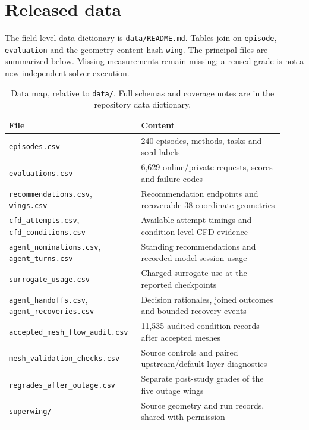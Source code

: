 \section{Released data}
\label{app:datacard}

The field-level data dictionary is \texttt{data/README.md}. Tables join on
\texttt{episode}, \texttt{evaluation} and the geometry content hash
\texttt{wing}. The principal files are summarized below. Missing measurements
remain missing; a reused grade is not a new independent solver execution.

\begin{table}[htbp]
\centering\small
\caption{Data map, relative to \texttt{data/}. Full schemas and coverage notes
are in the repository data dictionary.}
\label{tab:data-overview}
\begin{tabular}{p{0.42\linewidth}p{0.50\linewidth}}
\toprule
File & Content \\
\midrule
\texttt{episodes.csv} & 240 episodes, methods, tasks and seed labels \\
\texttt{evaluations.csv} & 6{,}629 online/private requests, scores and failure codes \\
\texttt{recommendations.csv}, \texttt{wings.csv} & Recommendation endpoints and recoverable 38-coordinate geometries \\
\texttt{cfd\_attempts.csv}, \texttt{cfd\_conditions.csv} & Available attempt timings and condition-level CFD evidence \\
\texttt{agent\_nominations.csv}, \texttt{agent\_turns.csv} & Standing recommendations and recorded model-session usage \\
\texttt{surrogate\_usage.csv} & Charged surrogate use at the reported checkpoints \\
\texttt{agent\_handoffs.csv}, \texttt{agent\_recoveries.csv} & Decision rationales, joined outcomes and bounded recovery events \\
\texttt{accepted\_mesh\_flow\_audit.csv} & 11{,}535 audited condition records after accepted meshes \\
\texttt{mesh\_validation\_checks.csv} & Source controls and paired upstream/default-layer diagnostics \\
\texttt{regrades\_after\_outage.csv} & Separate post-study grades of the five outage wings \\
\texttt{superwing/} & Source geometry and run records, shared with permission \\
\bottomrule
\end{tabular}
\end{table}

